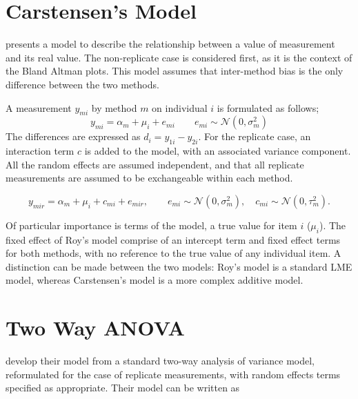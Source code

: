 \documentclass[12pt, a4paper]{report}
\theoremstyle{plain}
\theoremstyle{definition}
\theoremstyle{remark}
\begin{document}
\newpage

\section{Carstensen's Model}



\citet{BXC2004} presents a model to describe the relationship between a value of measurement and its
real value. The non-replicate case is considered first, as it is the context of the Bland Altman plots. This model assumes that inter-method bias is the only difference between the two methods.

A measurement $y_{mi}$ by method $m$ on individual $i$ is formulated as follows;
\begin{equation}
y_{mi}  = \alpha_{m} + \mu_{i} + e_{mi} \qquad  e_{mi} \sim
\mathcal{N}(0,\sigma^{2}_{m})
\end{equation}
The differences are expressed as $d_{i} = y_{1i} - y_{2i}$. For the replicate case, an interaction term $c$ is added to the model, with an associated variance component. All the random effects are assumed independent, and that all replicate measurements are assumed to be exchangeable within each method.

\begin{equation}
y_{mir}  = \alpha_{m} + \mu_{i} + c_{mi} + e_{mir}, \qquad  e_{mi}
\sim \mathcal{N}(0,\sigma^{2}_{m}), \quad c_{mi} \sim \mathcal{N}(0,\tau^{2}_{m}).
\end{equation}

Of particular importance is terms of the model, a true value for item $i$ ($\mu_{i}$).  The fixed effect of Roy's model comprise of an intercept term and fixed effect terms for both methods, with no reference to the true value of any individual item. A distinction can be made between the two models: Roy's model is a standard LME model, whereas Carstensen's model is a more complex additive model.

	\bigskip
	\section{Two Way ANOVA}
	\citet{BXC2008} develop their model from a standard two-way analysis of variance model, reformulated for the case of replicate measurements, with random effects terms specified as appropriate.
	Their model can be written as
	
\end{document}
